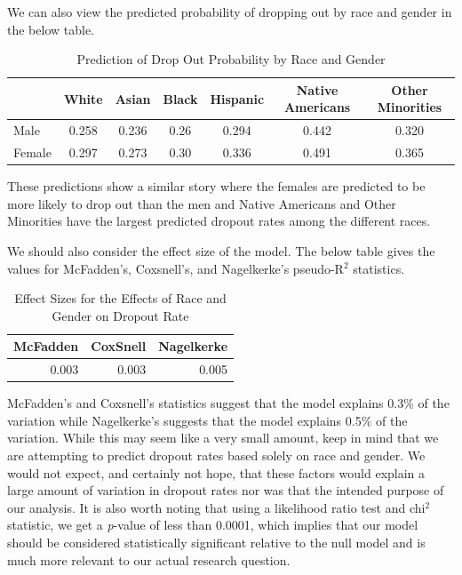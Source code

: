 \documentclass[]{article}
\begin{document}
We can also view the predicted probability of dropping out by race and
gender in the below table.

\begin{table}[H]

\caption{\label{tab:pred}Prediction of Drop Out Probability by Race and Gender}
\centering
\fontsize{12}{14}\selectfont
\begin{tabular}[t]{l|c|c|c|c|c|c}
\hline
  & White & Asian & Black & Hispanic & Native Americans & Other Minorities\\
\hline
Male & 0.258 & 0.236 & 0.26 & 0.294 & 0.442 & 0.320\\
\hline
Female & 0.297 & 0.273 & 0.30 & 0.336 & 0.491 & 0.365\\
\hline
\end{tabular}
\end{table}

These predictions show a similar story where the females are predicted
to be more likely to drop out than the men and Native Americans and
Other Minorities have the largest predicted dropout rates among the
different races.

We should also consider the effect size of the model. The below table
gives the values for McFadden's, Coxsnell's, and Nagelkerke's
pseudo-R\(^2\) statistics.

\begin{table}[H]

\caption{\label{tab:efntable}Effect Sizes for the Effects of Race and Gender on Dropout Rate}
\centering
\fontsize{12}{14}\selectfont
\begin{tabular}[t]{r|r|r}
\hline
McFadden & CoxSnell & Nagelkerke\\
\hline
0.003 & 0.003 & 0.005\\
\hline
\end{tabular}
\end{table}

McFadden's and Coxsnell's statistics suggest that the model explains
0.3\% of the variation while Nagelkerke's suggests that the model
explains 0.5\% of the variation. While this may seem like a very small
amount, keep in mind that we are attempting to predict dropout rates
based solely on race and gender. We would not expect, and certainly not
hope, that these factors would explain a large amount of variation in
dropout rates nor was that the intended purpose of our analysis. It is
also worth noting that using a likelihood ratio test and chi\(^2\)
statistic, we get a \emph{p}-value of less than 0.0001, which implies
that our model should be considered statistically significant relative
to the null model and is much more relevant to our actual research
question.
\end{document}
